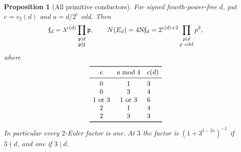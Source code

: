 \documentclass[11pt,a4paper]{article}
\numberwithin{equation}{section}
\newtheorem{proposition}[theorem]{Proposition}
\theoremstyle{definition}
\theoremstyle{remark}
\newcommand{\N}{\mathrm N}
\begin{document}
\begin{proposition}[All primitive conductors]\label{prop:conductor}
For signed fourth-power-free $d$, put $e=v_2(d)$ and $a=d/2^e$ odd. Then
\begin{equation}\label{eq:conductord}
 \mathfrak f_d=\lambda^{c(d)}
              \prod_{\substack{\mathfrak p\mid d\\\mathfrak p\nmid2}}
                         \mathfrak p ,
 \qquad N(E_d)=4\N\mathfrak f_d
       =2^{c(d)+2}\prod_{\substack{p\mid d\\p\ {\rm odd}}}p^2,
\end{equation}
where
\[
\begin{array}{ccl}
 \toprule
 e&a\bmod4&c(d)\\
 \midrule
 0&1&3\\
 0&3&4\\
 1\text{ or }3&1\text{ or }3&6\\
 2&1&4\\
 2&3&3\\
 \bottomrule
\end{array}
\]
In particular every $2$-Euler factor is one. At $3$ the factor is
$(1+3^{1-2s})^{-1}$ if $3\nmid d$, and one if $3\mid d$.
\end{proposition}
\end{document}

